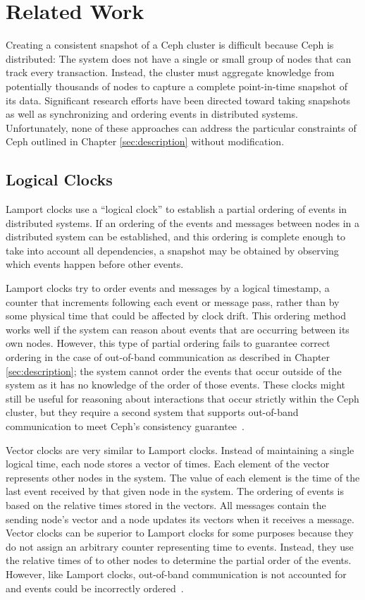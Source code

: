 \chapter{Related Work}
\label{sec:rel-work}

Creating a consistent snapshot of a Ceph cluster is difficult because
Ceph is distributed: The system does not have a single or small group
of nodes that can track every transaction. Instead, the cluster must
aggregate knowledge from potentially thousands of nodes to capture a
complete point-in-time snapshot of its data.  Significant research
efforts have been directed toward taking snapshots as well as
synchronizing and ordering events in distributed
systems. Unfortunately, none of these approaches can address the
particular constraints of Ceph outlined in Chapter
\ref{sec:description} without modification.

\section{Logical Clocks}

Lamport clocks use a ``logical clock'' to establish a partial ordering
of events in distributed systems. If an ordering of the events and
messages between nodes in a distributed system can be established, and
this ordering is complete enough to take into account all
dependencies, a snapshot may be obtained by observing which events
happen before other events.

Lamport clocks try to order events and messages by a logical
timestamp, a counter that increments following each event or message
pass, rather than by some physical time that could be affected by
clock drift. This ordering method works well if the system can reason
about events that are occurring between its own nodes. However, this
type of partial ordering fails to guarantee correct ordering in the
case of out-of-band communication as described in Chapter
\ref{sec:description}; the system cannot order the events that occur
outside of the system as it has no knowledge of the order of those
events. These clocks might still be useful for reasoning about
interactions that occur strictly within the Ceph cluster, but they
require a second system that supports out-of-band communication to
meet Ceph's consistency guarantee~\citep{Lamport1978}.

Vector clocks are very similar to Lamport clocks. Instead of
maintaining a single logical time, each node stores a vector of
times. Each element of the vector represents other nodes in the
system.  The value of each element is the time of the last event
received by that given node in the system. The ordering of events is
based on the relative times stored in the vectors. All messages
contain the sending node's vector and a node updates its vectors when
it receives a message. Vector clocks can be superior to Lamport clocks
for some purposes because they do not assign an arbitrary counter
representing time to events. Instead, they use the relative times of
to other nodes to determine the partial order of the events. However,
like Lamport clocks, out-of-band communication is not accounted for
and events could be incorrectly ordered~\citep{Fidge1988}.

